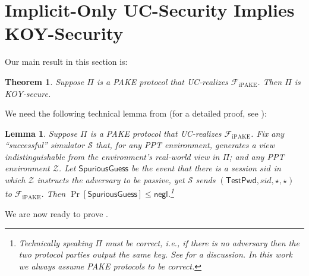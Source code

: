 \documentclass{article}
\newtheorem{theorem}{Theorem}
\newtheorem{lemma}{Lemma}
\newcommand{\negl}{\mathsf{negl}}
\newcommand{\env}{\mathcal{Z}}
\renewcommand{\sim}{\mathcal{S}}
\newcommand{\func}{\mathcal{F}}
\newcommand{\Fipake}{\func_\mathrm{iPAKE}}
\newcommand{\TestPwd}{\mathsf{TestPwd}}
\newcommand{\SpuriousGuess}{\mathsf{SpuriousGuess}}
\begin{document}
\section{Implicit-Only UC-Security Implies KOY-Security}
\label{sec:implicit-only}
Our main result in this section is:
\begin{theorem}
\label{thm:implicit-only}
Suppose $\Pi$ is a PAKE protocol that UC-realizes $\Fipake$. Then $\Pi$ is KOY-secure.
\end{theorem}
We need the following technical lemma from \cite[Lemma~A.1]{EC:CHKLM05} (for a detailed proof, see \cite[Appendix~A]{PKC:RoyXu23}):
\begin{lemma}
\label{lem:spuriousguess}
Suppose $\Pi$ is a PAKE protocol that UC-realizes $\Fipake$. Fix any ``successful'' simulator $\sim$ that, for any PPT environment, generates a view indistinguishable from the environment's real-world view in $\Pi$; and any PPT environment $\env$. Let $\SpuriousGuess$ be the event that there is a session $sid$ in which $\env$ instructs the adversary to be passive, yet $\sim$ sends $(\TestPwd, sid, \star, \star)$ to $\Fipake$. Then $\Pr[\SpuriousGuess] \leq \negl$.\footnote{Technically speaking $\Pi$ must be correct, i.e., if there is no adversary then the two protocol parties output the same key. See \cite{PKC:RoyXu23} for a discussion. In this work we always assume PAKE protocols to be correct.}
\end{lemma}
We are now ready to prove .
\end{document}
